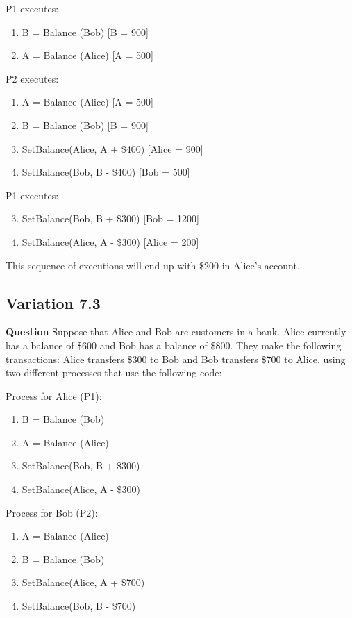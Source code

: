 P1 executes:
\begin{enumerate}
    \item B = Balance (Bob) [B = 900]
    \item A = Balance (Alice) [A = 500]
\end{enumerate}
P2 executes:
\begin{enumerate}
    \item A = Balance (Alice) [A = 500]
    \item B = Balance (Bob) [B = 900]
    \item SetBalance(Alice, A + \$400) [Alice = 900]
    \item SetBalance(Bob, B - \$400) [Bob = 500]
\end{enumerate}
P1 executes:
\begin{enumerate}
    \setcounter{enumi}{2}
    \item SetBalance(Bob, B + \$300) [Bob = 1200]
    \item SetBalance(Alice, A - \$300) [Alice = 200]
\end{enumerate}
This sequence of executions will end up with \$200 in Alice’s account.

\subsection{Variation 7.3}

\textbf{Question}
Suppose that Alice and Bob are customers in a bank. Alice currently has a balance of \$600 and Bob has a balance of \$800. They make the following transactions: Alice transfers \$300 to Bob and Bob transfers \$700 to Alice, using two different processes that use the following code:

Process for Alice (P1):
\begin{enumerate}
    \item B = Balance (Bob)
    \item A = Balance (Alice)
    \item SetBalance(Bob, B + \$300)
    \item SetBalance(Alice, A - \$300)
\end{enumerate}

Process for Bob (P2):
\begin{enumerate}
    \item A = Balance (Alice)
    \item B = Balance (Bob)
    \item SetBalance(Alice, A + \$700)
    \item SetBalance(Bob, B - \$700)
\end{enumerate}

